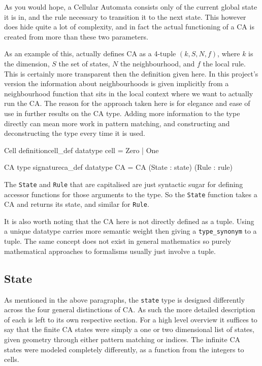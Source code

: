 As you would hope,
a Cellular Automata consists only of the current global state it is in,
and the rule necessary to transition it to the next state.
This however does hide quite a lot of complexity,
and in fact the actual functioning of a CA is created from more than these two parameters.

As an example of this,
\cite{yu} actually defines CA as a 4-tuple $(k, S, N, f)$,
where $k$ is the dimension,
$S$ the set of states,
$N$ the neighbourhood,
and $f$ the local rule.
This is certainly more transparent then the definition given here.
In this project's version the information about neighbourhoods is given implicitly from a neighbourhood function that sits in the local context where we want to actually run the CA.
The reason for the approach taken here is for elegance and ease of use in further results on the CA type.
Adding more information to the type directly can mean more work in pattern matching,
and constructing and deconstructing the type every time it is used.

\begin{myminted}{Cell definition}{cell_def}
    datatype cell = Zero | One
\end{myminted}

\begin{myminted}{CA type signature}{ca_def}
    datatype CA = CA (State : state) (Rule : rule)
\end{myminted}

The \texttt{State} and \texttt{Rule} that are capitalised are just syntactic sugar for defining accessor functions for those arguments to the type.
So the \texttt{State} function takes a CA and returns its state, 
and similar for \texttt{Rule}.

It is also worth noting that the CA here is not directly defined as a tuple.
Using a unique datatype carries more semantic weight then giving a \texttt{type_synonym} to a tuple.
The same concept does not exist in general mathematics so purely mathematical approaches to formalisms usually just involve a tuple.


\subsection{State}

As mentioned in the above paragraphs,
the \texttt{state} type is designed differently across the four general distinctions of CA.
As such the more detailed description of each is left to its own respective section.
For a high level overview it suffices to say that the finite CA states were simply a one or two dimensional list of states,
given geometry through either pattern matching or indices.
The infinite CA states were modeled completely differently,
as a function from the integers to cells.

